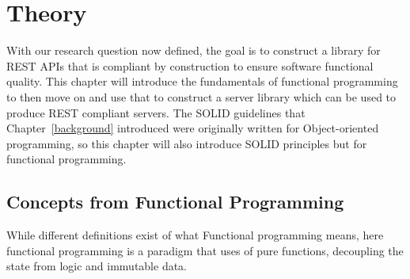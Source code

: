 \chapter{Theory}\label{theory} 

With our research question now defined, the goal is to construct a library for
REST APIs that is compliant by construction to ensure software functional
quality. This chapter will introduce the fundamentals of functional programming
to then move on and use that to construct a server library which can be used to
produce REST compliant servers. The SOLID guidelines that
Chapter~\ref{background} introduced were originally written for Object-oriented
programming, so this chapter will also introduce SOLID principles but for
functional programming. 

\section{Concepts from Functional Programming}\label{functionalprogramming}

 While different definitions exist of what Functional programming means, here 
 functional programming is a paradigm that uses of pure functions,
 decoupling the state from logic and immutable data.~\cite{hughes1989functional}

